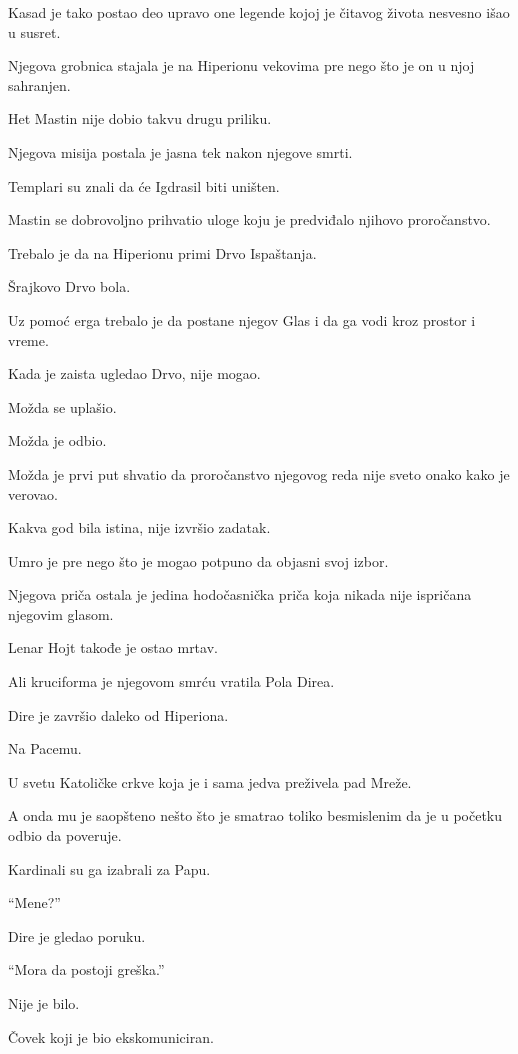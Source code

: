 Kasad je tako postao deo upravo one legende kojoj je čitavog života nesvesno išao u susret.

Njegova grobnica stajala je na Hiperionu vekovima pre nego što je on u njoj sahranjen.

\bigskip

Het Mastin nije dobio takvu drugu priliku.

Njegova misija postala je jasna tek nakon njegove smrti.

Templari su znali da će Igdrasil biti uništen.

Mastin se dobrovoljno prihvatio uloge koju je predviđalo njihovo proročanstvo.

Trebalo je da na Hiperionu primi Drvo Ispaštanja.

Šrajkovo Drvo bola.

Uz pomoć erga trebalo je da postane njegov Glas i da ga vodi kroz prostor i vreme.

Kada je zaista ugledao Drvo, nije mogao.

Možda se uplašio.

Možda je odbio.

Možda je prvi put shvatio da proročanstvo njegovog reda nije sveto onako kako je verovao.

Kakva god bila istina, nije izvršio zadatak.

Umro je pre nego što je mogao potpuno da objasni svoj izbor.

Njegova priča ostala je jedina hodočasnička priča koja nikada nije ispričana njegovim glasom.

\bigskip

Lenar Hojt takođe je ostao mrtav.

Ali kruciforma je njegovom smrću vratila Pola Direa.

Dire je završio daleko od Hiperiona.

Na Pacemu.

U svetu Katoličke crkve koja je i sama jedva preživela pad Mreže.

A onda mu je saopšteno nešto što je smatrao toliko besmislenim da je u početku odbio da poveruje.

Kardinali su ga izabrali za Papu.

\bigskip

``Mene?''

Dire je gledao poruku.

``Mora da postoji greška.''

Nije je bilo.

Čovek koji je bio ekskomuniciran.

